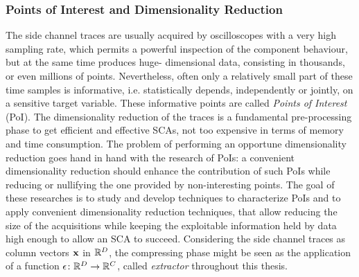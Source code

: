 \subsubsection{Points of Interest and Dimensionality Reduction}\label{sec:extractors}
The side channel traces are usually acquired by oscilloscopes with a very high sampling rate, which permits a powerful inspection of the component behaviour, but at the same time produces huge- dimensional data, consisting in thousands, or even millions of points. Nevertheless, often only a relatively small part of these time samples is informative, i.e. statistically depends, independently or jointly, on a sensitive target variable. These informative points are called \emph{Points of Interest} (PoI). The dimensionality reduction of the traces is a fundamental pre-processing phase to get efficient and effective SCAs, not too expensive in terms of memory and time consumption. The problem of performing an opportune dimensionality reduction goes hand in hand with the research of PoIs: a convenient dimensionality reduction should enhance the contribution of such PoIs while reducing or nullifying the one provided by non-interesting points. 
The goal of these researches is to study and develop techniques to characterize PoIs and to apply convenient dimensionality reduction techniques, that allow reducing the size of the acquisitions while keeping the exploitable information held by data high enough to allow an SCA to succeed.
Considering the side channel traces as column vectors ${\bf x}$ in $\mathbb{R}^D$, the compressing phase might be seen as the application of a function $\epsilon\colon \mathbb{R}^D\rightarrow \mathbb{R}^C$, called {\em extractor} throughout this thesis.


